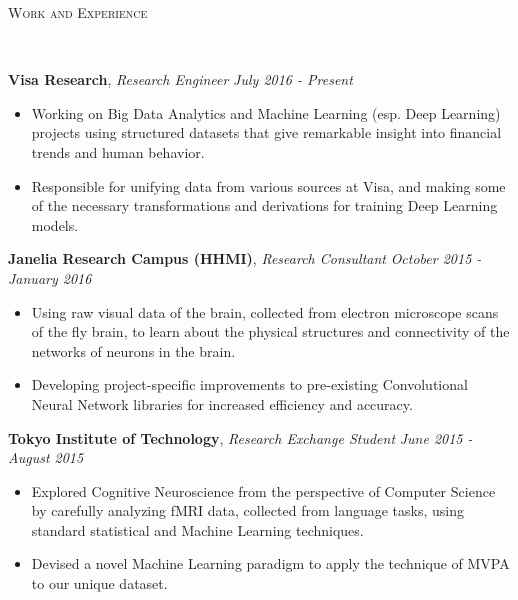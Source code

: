 \documentclass[9pt]{article}
\newenvironment{changemargin}[2]{%
  \begin{list}{}{%
    \setlength{\topsep}{0pt}%
    \setlength{\leftmargin}{#1}%
    \setlength{\rightmargin}{#2}%
    \setlength{\listparindent}{\parindent}%
    \setlength{\itemindent}{\parindent}%
    \setlength{\parsep}{\parskip}%
  }%
  \item[]}{\end{list}
}
\newcommand{\lineover}{
	\begin{changemargin}{-0.05in}{-0.05in}
		\vspace*{-8pt}
		\hrulefill \\
		\vspace*{-2pt}
	\end{changemargin}
}
\newcommand{\header}[1]{
	\begin{changemargin}{-0.5in}{-0.5in}
		\scshape{#1}\\
  	\lineover
	\end{changemargin}
}
\newenvironment{body} {
	\vspace*{-16pt}
	\begin{changemargin}{-0.25in}{-0.5in}
  }	
	{\end{changemargin}
}
\begin{document}
\header{Work and Experience}
\begin{body}
	\vspace{14pt}
	\textbf{Visa Research}, \emph{Research Engineer} \hfill \emph{July 2016 - Present}\\
	\vspace*{-3pt}
	\begin{itemize} \itemsep -0pt %
	\item Working on Big Data Analytics and Machine Learning (esp. Deep Learning) projects using structured datasets that give remarkable insight into financial trends and human behavior.
	\item Responsible for unifying data from various sources at Visa, and making some of the necessary transformations and derivations for training Deep Learning models.
	\end{itemize}
	\vspace*{-2pt}
	\textbf{Janelia Research Campus (HHMI)}, \emph{Research Consultant} \hfill \emph{October 2015 - January 2016}\\
	\vspace*{-3pt}
	\begin{itemize} \itemsep -0pt %
	\item Using raw visual data of the brain, collected from electron microscope scans of the fly brain, to learn about the physical structures and connectivity of the networks of neurons in the brain.
	\item Developing project-specific improvements to pre-existing Convolutional Neural Network libraries for increased efficiency and accuracy.
	\end{itemize}
	\vspace*{-2pt}
	\textbf{Tokyo Institute of Technology}, \emph{Research Exchange Student} \hfill \emph{June 2015 - August 2015}\\
	\vspace*{-3pt}
	\begin{itemize} \itemsep -0pt %
	\item Explored Cognitive Neuroscience from the perspective of Computer Science by carefully analyzing fMRI data, collected from language tasks, using standard statistical and Machine Learning techniques.
	\item Devised a novel Machine Learning paradigm to apply the technique of MVPA to our unique dataset.

\end{itemize}
\end{body}
\end{document}
